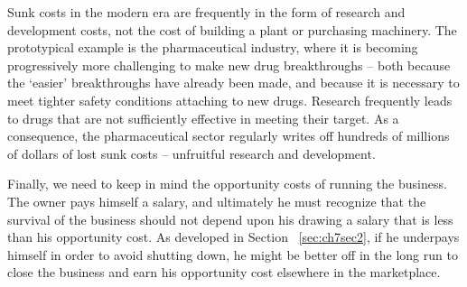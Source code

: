 Sunk costs in the modern era are frequently in the form of research and
development costs, not the cost of building a plant or purchasing machinery.
The prototypical example is the pharmaceutical industry, where it is
becoming progressively more challenging to make new drug breakthroughs --
both because the `easier' breakthroughs have already been made, and because
it is necessary to meet tighter safety conditions attaching to new drugs.
Research frequently leads to drugs that are not sufficiently effective in
meeting their target. As a consequence, the pharmaceutical sector regularly
writes off hundreds of millions of dollars of lost sunk costs -- unfruitful
research and development.

Finally, we need to keep in mind the opportunity costs of running the
business. The owner pays himself a salary, and ultimately he must recognize
that the survival of the business should not depend upon his drawing a
salary that is less than his opportunity cost. As developed in Section%
~\ref{sec:ch7sec2}, if he underpays himself in
order to avoid shutting down, he might be better off in the long run to
close the business and earn his opportunity cost elsewhere in the
marketplace.